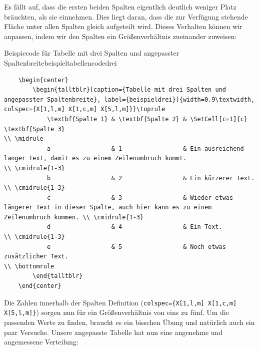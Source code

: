 Es fällt auf, dass die ersten beiden Spalten eigentlich deutlich weniger Platz
bräuchten, als sie einnehmen. Dies liegt daran, dass die zur Verfügung stehende
Fläche unter allen Spalten gleich aufgeteilt wird. Dieses Verhalten können wir
anpassen, indem wir den Spalten ein Größenverhältnis zueinander zuweisen:
\pagebreak
\begin{code}{Beispiecode für Tabelle mit drei Spalten und angepasster Spaltenbreite}{beispieltabellencodedrei}
	\begin{verbatim}
	\begin{center}
		\begin{talltblr}[caption={Tabelle mit drei Spalten und angepasster Spaltenbreite}, label={beispieldrei}]{width=0.9\textwidth, colspec={X[1,l,m] X[1,c,m] X[5,l,m]}}\toprule
			\textbf{Spalte 1} & \textbf{Spalte 2} & \SetCell[c=1]{c} \textbf{Spalte 3}                                                            \\ \midrule
			a                 & 1                 & Ein ausreichend langer Text, damit es zu einem Zeilenumbruch kommt.                           \\ \cmidrule{1-3}
			b                 & 2                 & Ein kürzerer Text.                                                                            \\ \cmidrule{1-3}
			c                 & 3                 & Wieder etwas längerer Text in dieser Spalte, auch hier kann es zu einem Zeilenumbruch kommen. \\ \cmidrule{1-3}
			d                 & 4                 & Ein Text.                                                                                     \\ \cmidrule{1-3}
			e                 & 5                 & Noch etwas zusätzlicher Text.                                                                 \\ \bottomrule
		\end{talltblr}
	\end{center}
	\end{verbatim}
\end{code}

Die Zahlen innerhalb der Spalten Definition (\texttt{colspec=\{X[1,l,m]
	X[1,c,m] X[5,l,m]\}}) sorgen nun für ein Größenverhältnis
von eins zu fünf. Um die passenden Werte zu finden, braucht es ein bisschen
Übung und natürlich auch ein paar Versuche. Unsere angepasste Tabelle hat nun
eine angenehme und angemessene Verteilung:

